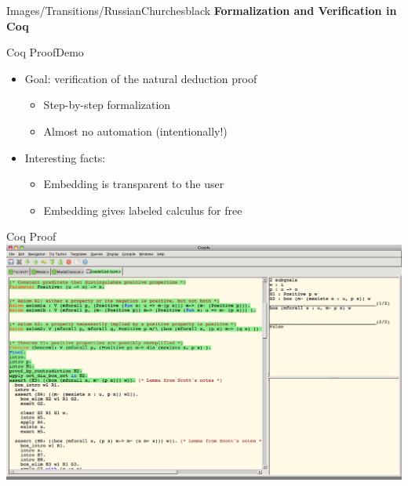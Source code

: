\begin{transitionframe}{Images/Transitions/RussianChurches}{black}
\textbf{Formalization and Verification in Coq}
\end{transitionframe}

\begin{frame}{Coq Proof}{Demo}
\begin{itemize}
\item \begin{LARGE} Goal: verification of the natural deduction proof \end{LARGE}
\begin{itemize}
\item \begin{large} Step-by-step formalization \end{large}
\pause
\item \begin{large} Almost no automation (intentionally!) \end{large}
\end{itemize}
%
\pause
\item \begin{LARGE} Interesting facts: \end{LARGE}
\begin{itemize}
\item \begin{large} Embedding is transparent to the user \end{large}
\pause
\item \begin{large} Embedding gives labeled calculus for free \end{large}
\end{itemize}
\end{itemize}
\end{frame}

\begin{frame}{Coq Proof}
\colorbox{gray}{\includegraphics[width=\textwidth]{Images/Demos/CoqDemo.png}}
\end{frame}
